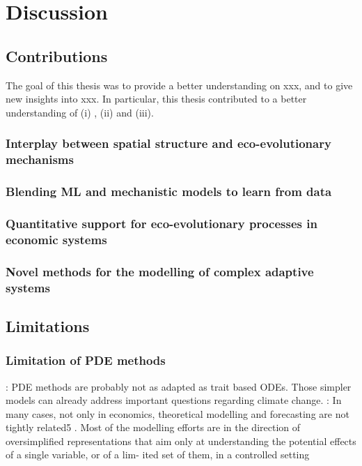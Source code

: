 %
\chapter{Discussion}
\label{sec:conclusion}

\section{Contributions}
The goal of this thesis was to provide a better understanding on xxx, and to give new insights into xxx. In particular, this thesis contributed to a better understanding of (i) , (ii) and (iii).

\subsection{Interplay between spatial structure and eco-evolutionary mechanisms}

\subsection{Blending ML and mechanistic models to learn from data}

\subsection{Quantitative support for eco-evolutionary processes in economic systems}

\subsection{Novel methods for the modelling of complex adaptive systems}


\section{Limitations}

\subsection{Limitation of PDE methods}
\cite{Akesson2021} : PDE methods are probably not as adapted as trait based ODEs. Those simpler models can already address important questions regarding climate change.
\cite{Tacchella2018}: In many cases, not only in economics, theoretical modelling and forecasting are not tightly related5
. Most of the modelling efforts are
in the direction of oversimplified representations that aim only at understanding the potential effects of a single variable, or of a lim- ited set of them, in a controlled setting

